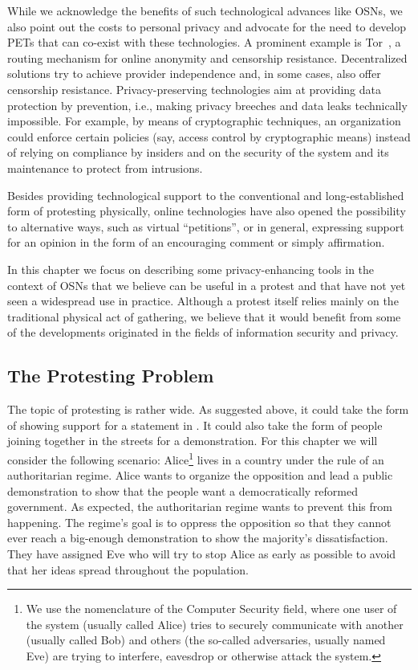 While we acknowledge the benefits of such technological advances like
\acp{OSN}, we also point out the costs to personal privacy and
advocate for the need to develop \acp{PET} that can co-exist with
these technologies. A prominent example is Tor~\cite{Tor}, a routing
mechanism for online anonymity and censorship
resistance. Decentralized solutions try to achieve provider
independence and, in some cases, also offer censorship
resistance. Privacy-preserving technologies aim at providing data
protection by prevention, i.e., making privacy breeches and data leaks
technically impossible. For example, by means of cryptographic
techniques, an organization could enforce certain policies (say,
access control by cryptographic means) instead of relying on
compliance by insiders and on the security of the system and its
maintenance to protect from
intrusions. %

Besides providing technological support to the conventional and
long-established form of protesting physically, online technologies
have also opened the possibility to alternative ways, such as virtual
\enquote{petitions}, or in general, expressing support for an opinion
in the form of an encouraging comment or simply affirmation.

In this chapter we focus on describing some privacy-enhancing tools in
the context of \acp{OSN} that we believe can be useful in a protest
and that have not yet seen a widespread use in practice. Although a
protest itself relies mainly on the traditional physical act of
gathering, we believe that it would benefit from some of the
developments originated in the fields of information security and
privacy.

\subsection{The Protesting Problem}

The topic of protesting is rather wide.
As suggested above, it could take the form of showing support for a statement 
in .
It could also take the form of people joining together in the streets for 
a demonstration.
For this chapter we will consider the following scenario:
Alice\footnote{%
  We use the nomenclature of the Computer Security field,
  where one user of the system (usually called Alice) tries to securely communicate
  with another (usually called Bob) and others (the so-called adversaries, usually
  named Eve) are trying to interfere, eavesdrop or otherwise attack the
  system. 

} lives in a country under the rule of an authoritarian regime.
Alice wants to organize the opposition and lead a public demonstration to show 
that the people want a democratically reformed government.
As expected, the authoritarian regime wants to prevent this from happening.
The regime's goal is to oppress the opposition so that they cannot ever reach 
a big-enough demonstration to show the majority's dissatisfaction.
They have assigned Eve who will try to stop Alice as early as possible to avoid 
that her ideas spread throughout the population.


